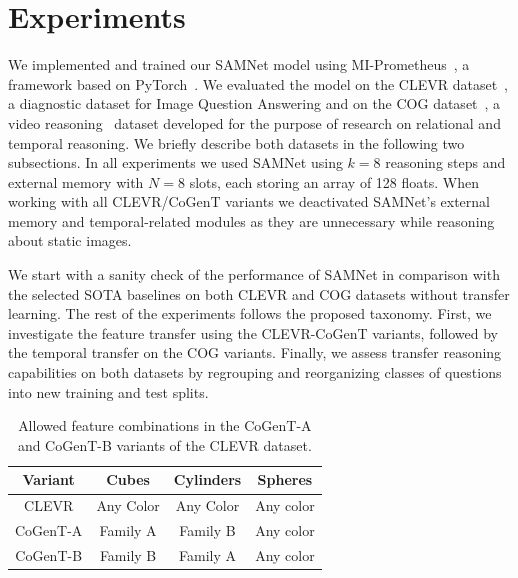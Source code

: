 \section{Experiments}
\label{sec:experiments}

We implemented and trained our SAMNet model using MI-Prometheus~\cite{kornuta2018accelerating}, a framework based on PyTorch~\cite{paszke2017automatic}.
We evaluated the model on 
the CLEVR dataset~\cite{johnson2017clevr}, a diagnostic dataset for Image Question Answering and on the COG dataset~\cite{yang2018dataset}, a video reasoning~\cite{mogadala2019trends} dataset developed for the purpose of research on relational and temporal reasoning.
We briefly describe both datasets in the following two subsections.
In all experiments we used SAMNet using $k = 8$ reasoning steps and external memory with $N = 8$ slots, each storing an array of 128 floats. 
When working with all CLEVR/CoGenT variants we deactivated SAMNet's external memory and temporal-related modules as they are unnecessary while reasoning about static images.

We start with a sanity check of the performance of SAMNet in comparison with the selected SOTA baselines on both CLEVR and COG datasets without transfer learning.
The rest of the experiments follows the proposed taxonomy.
First, we investigate the feature transfer using the CLEVR-CoGenT variants, followed by the temporal transfer on the COG variants. Finally, we assess transfer reasoning capabilities on both datasets by regrouping and reorganizing classes of questions into new training and test splits.

\begin{table}[b!]
	\centering
	\begin{tabular}{cccc}
		\toprule
		Variant	& Cubes	& Cylinders &	Spheres	\\
		\midrule
		CLEVR &  Any Color  & Any Color 	&	Any color  \\
		CoGenT-A &  Family A  & Family B 	&	Any color  \\
		CoGenT-B	&	Family B  &	Family A	&	Any color \\
		\bottomrule
	\end{tabular}
	\caption{Allowed feature combinations in the CoGenT-A and CoGenT-B variants of the CLEVR dataset.}%
	\label{tab:cogent_conditions}
\end{table}

